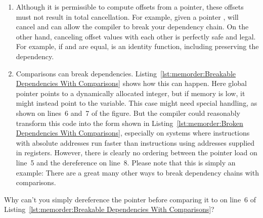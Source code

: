 \begin{enumerate}
\item	Although it is permissible to compute offsets from a
	pointer, these offsets must not result in total cancellation.
	For example, given a  pointer ,
	 will cancel and can allow the compiler
	to break your dependency chain.
	On the other hand, canceling offset values with each other
	is perfectly safe and legal.
	For example, if  and  are equal, 
	is an identity function, including preserving the dependency.
\item	Comparisons can break dependencies.
	Listing~\ref{lst:memorder:Breakable Dependencies With Comparisons}
	shows how this can happen.
	Here global pointer  points to a dynamically allocated
	integer, but if memory is low, it might instead point to
	the  variable.
	This  case might need special handling, as
	shown on lines~6 and~7 of the figure.
	But the compiler could reasonably transform this code into
	the form shown in
	Listing~\ref{lst:memorder:Broken Dependencies With Comparisons},
	especially on systems where instructions with absolute
	addresses run faster than instructions using addresses
	supplied in registers.
	However, there is clearly no ordering between the pointer
	load on line~5 and the dereference on line~8.
	Please note that this is simply an example: There are a great
	many other ways to break dependency chains with comparisons.
\end{enumerate}

\QuickQuiz{}
	Why can't you simply dereference the pointer before comparing it
	to  on line~6 of
	Listing~\ref{lst:memorder:Breakable Dependencies With Comparisons}?
 \QuickQuizEnd

